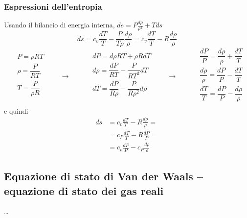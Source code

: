 \subsubsection{Espressioni dell'entropia}
Usando il bilancio di energia interna, $de  = P \frac{d \rho}{\rho^2} + T ds $
\begin{equation}
  ds = c_v \frac{dT}{T} - \frac{P}{T \rho} \frac{d \rho}{\rho} =  c_v \frac{dT}{T} - R \frac{d \rho}{\rho}
\end{equation}
\begin{equation}
\begin{aligned}
    & P = \rho R T \\
    & \rho = \dfrac{P}{RT} \\
    & T = \dfrac{P}{\rho R} \\
\end{aligned} \qquad \rightarrow \qquad
\begin{aligned}
    & dP = d \rho R T + \rho R dT \\
    & d \rho = \dfrac{d P}{R T} - \dfrac{P}{R T^2} dT \\
    & dT = \dfrac{d P}{R \rho} - \dfrac{P}{R \rho^2} d\rho \\
\end{aligned} \qquad \rightarrow \qquad
\begin{aligned}
    & \dfrac{dP}{P} = \dfrac{d \rho}{\rho} + \dfrac{ dT}{T} \\
    & \dfrac{d \rho}{\rho} = \dfrac{d P}{P} - \dfrac{dT}{T} \\
    & \dfrac{dT}{T} = \dfrac{d P}{P} - \dfrac{d\rho}{\rho} \\
\end{aligned}
\end{equation}
e quindi
\begin{equation}\label{eqn:pig-entropy}
\begin{aligned}
  ds & =  c_v \frac{dT}{T} - R \frac{d \rho}{\rho} =  \\
     & =  c_P \frac{dT}{T} - R \frac{d P   }{P   } =  \\
     & =  c_v \frac{dP}{P} - c_P \frac{d \rho}{\rho} 
\end{aligned}
\end{equation}
\subsection{Equazione di stato di Van der Waals -- equazione di stato dei gas reali}
{\color{red} \dots}

